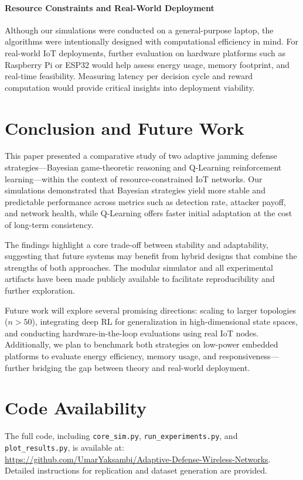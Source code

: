 \documentclass[conference]{IEEEtran}
\begin{document}
\paragraph{Resource Constraints and Real-World Deployment}

Although our simulations were conducted on a general-purpose laptop, the algorithms were intentionally designed with computational efficiency in mind. For real-world IoT deployments, further evaluation on hardware platforms such as Raspberry Pi or ESP32 would help assess energy usage, memory footprint, and real-time feasibility. Measuring latency per decision cycle and reward computation would provide critical insights into deployment viability.

\section{Conclusion and Future Work}

This paper presented a comparative study of two adaptive jamming defense strategies—Bayesian game-theoretic reasoning and Q-Learning reinforcement learning—within the context of resource-constrained IoT networks. Our simulations demonstrated that Bayesian strategies yield more stable and predictable performance across metrics such as detection rate, attacker payoff, and network health, while Q-Learning offers faster initial adaptation at the cost of long-term consistency.

The findings highlight a core trade-off between stability and adaptability, suggesting that future systems may benefit from hybrid designs that combine the strengths of both approaches. The modular simulator and all experimental artifacts have been made publicly available to facilitate reproducibility and further exploration.

Future work will explore several promising directions: scaling to larger topologies ($n > 50$), integrating deep RL for generalization in high-dimensional state spaces, and conducting hardware-in-the-loop evaluations using real IoT nodes. Additionally, we plan to benchmark both strategies on low-power embedded platforms to evaluate energy efficiency, memory usage, and responsiveness—further bridging the gap between theory and real-world deployment.


\section*{Code Availability}
The full code, including \texttt{core\_sim.py}, \texttt{run\_experiments.py}, and \texttt{plot\_results.py}, is available at:\\
\url{https://github.com/UmarYaksambi/Adaptive-Defense-Wireless-Networks}. Detailed instructions for replication and dataset generation are provided.
\end{document}
